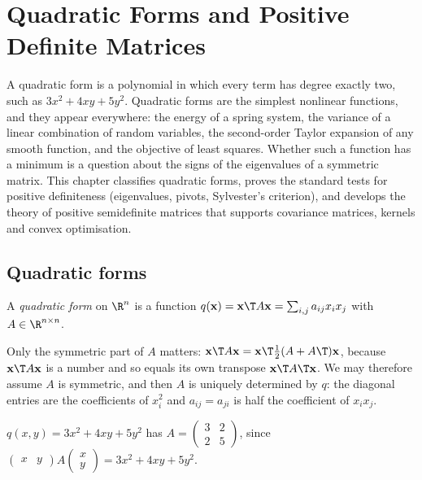 \chapter{Quadratic Forms and Positive Definite Matrices}

A quadratic form is a polynomial in which every term has degree exactly two, such as $3x^2+4xy+5y^2$. Quadratic forms are the simplest nonlinear functions, and they appear everywhere: the energy of a spring system, the variance of a linear combination of random variables, the second-order Taylor expansion of any smooth function, and the objective of least squares. Whether such a function has a minimum is a question about the signs of the eigenvalues of a symmetric matrix. This chapter classifies quadratic forms, proves the standard tests for positive definiteness (eigenvalues, pivots, Sylvester's criterion), and develops the theory of positive semidefinite matrices that supports covariance matrices, kernels and convex optimisation.

\section{Quadratic forms}

\begin{definition}
A \emph{quadratic form} on $\R^n$ is a function $q(\mathbf{x})=\mathbf{x}\T A\mathbf{x}=\sum_{i,j}a_{ij}x_ix_j$ with $A\in\R^{n\times n}$.
\end{definition}

Only the symmetric part of $A$ matters: $\mathbf{x}\T A\mathbf{x}=\mathbf{x}\T\tfrac12(A+A\T)\mathbf{x}$, because $\mathbf{x}\T A\mathbf{x}$ is a number and so equals its own transpose $\mathbf{x}\T A\T\mathbf{x}$. We may therefore assume $A$ is symmetric, and then $A$ is uniquely determined by $q$: the diagonal entries are the coefficients of $x_i^2$ and $a_{ij}=a_{ji}$ is half the coefficient of $x_ix_j$.

\begin{example}
$q(x,y)=3x^2+4xy+5y^2$ has $A=\begin{pmatrix}3&2\\2&5\end{pmatrix}$, since $\begin{pmatrix}x&y\end{pmatrix}A\begin{pmatrix}x\\y\end{pmatrix}=3x^2+4xy+5y^2$.
\end{example}

